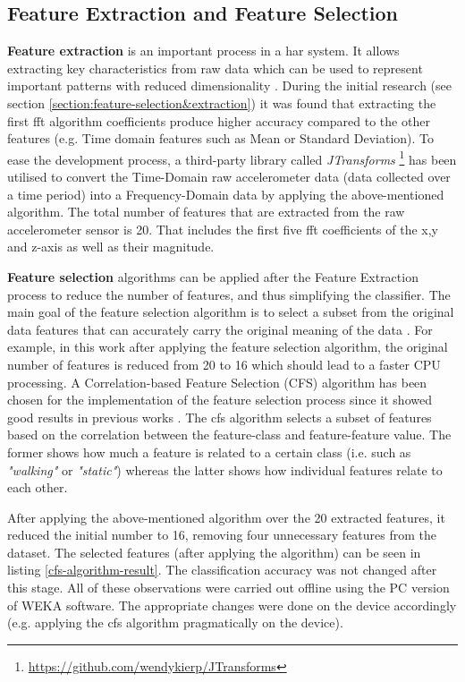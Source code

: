     \subsection{Feature Extraction and Feature Selection}
    \textbf{Feature extraction} is an important process in a \gls{har} system. It allows extracting key characteristics from raw data which can be used to represent important patterns with reduced dimensionality \citep[154]{torreshuitzil2015b}. During the initial research (see section \ref{section:feature-selection&extraction}) it was found that extracting the first \gls{fft} algorithm coefficients produce higher accuracy compared to the other features (e.g. Time domain features such as Mean or Standard Deviation). To ease the development process, a third-party library called \textit{JTransforms} \footnote{\url{https://github.com/wendykierp/JTransforms}} has been utilised to convert the Time-Domain raw accelerometer data (data collected over a time period) into a Frequency-Domain data by applying the above-mentioned algorithm. The total number of features that are extracted from the raw accelerometer sensor is 20. That includes the first five \gls{fft} coefficients of the x,y and z-axis as well as their magnitude. 
    
    \textbf{Feature selection} algorithms can be applied after the Feature Extraction process to reduce the number of features, and thus simplifying the classifier. The main goal of the feature selection algorithm is to select a subset from the original data features that can accurately carry the original meaning of the data \citep[22]{wu2008}. For example, in this work after applying the feature selection algorithm, the original number of features is reduced from 20 to 16 which should lead to a faster CPU processing. A Correlation-based Feature Selection (CFS) algorithm has been chosen for the implementation of the feature selection process since it showed good results in previous works \citep[220-224]{dinhle2015}. The \gls{cfs} algorithm selects a subset of features based on the correlation between the feature-class and feature-feature value. The former shows how much a feature is related to a certain class (i.e. such as \textit{"walking"} or \textit{"static"}) \citep{4021531} whereas the latter shows how individual features relate to each other.
    
    After applying the above-mentioned algorithm over the 20 extracted features, it reduced the initial number to 16, removing four unnecessary features from the dataset. The selected features (after applying the algorithm) can be seen in listing \ref{cfs-algorithm-result}. The classification accuracy was not changed after this stage. All of these observations were carried out offline using the PC version of WEKA software. The appropriate changes were done on the device accordingly (e.g. applying the \gls{cfs} algorithm pragmatically on the device).
    
